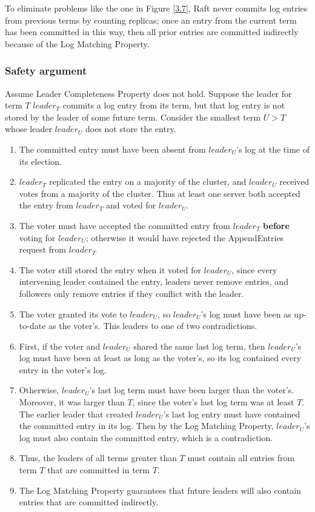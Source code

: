 \documentclass[11pt]{article}
\begin{document}
To eliminate problems like the one in Figure \ref{3.7}, Raft never commits log entries from previous
terms by counting replicas; once an entry from the current term has been committed in this way, then all prior
entries are committed indirectly because of the Log Matching Property.
\subsubsection{Safety argument}
\label{sec:orgeb7a043}
Assume Leader Completeness Property does not hold. Suppose the leader for term \(T\) \(leader_T\)
commits a log entry from its term, but that log entry is not stored by the leader of some future term.
Consider the smallest term \(U>T\) whose leader \(leader_U\) does not store the entry.
\begin{enumerate}
\item The committed entry must have been absent from \(leader_U\)'s log at the time of its election.
\item \(leader_T\) replicated the entry on a majority of the cluster, and \(leader_U\) received votes
from a majority of the cluster. Thus at least one server both accepted the entry from \(leader_T\)
and voted for \(leader_U\).
\item The voter must have accepted the committed entry from \(leader_T\) \textbf{before} voting for \(leader_U\);
otherwise it would have rejected the AppendEntries request from \(leader_T\)
\item The voter still stored the entry when it voted for \(leader_U\), since every intervening leader
contained the entry, leaders never remove entries, and followers only remove entries if they
conflict with the leader.
\item The voter granted its vote to \(leader_U\), so \(leader_U\)'s log must have been as up-to-date as
the voter's. This leaders to one of two contradictions.
\item First, if the voter and \(leader_U\) shared the same last log term, then \(leader_U\)'s log must
have been at least as long as the voter's, so its log contained every entry in the voter's log.
\item Otherwise, \(leader_U\)'s last log term must have been larger than the voter's. Moreover, it was
larger than \(T\), since the voter's last log term was at least \(T\). The earlier leader that
created \(leader_U\)'s last log entry must have contained the committed entry in its log. Then by
the Log Matching Property, \(leader_U\)'s log must also contain the committed entry, which is a contradiction.
\item Thus, the leaders of all terms greater than \(T\) must contain all entries from term \(T\) that are
committed in term \(T\).
\item The Log Matching Property guarantees that future leaders will also contain entries that are
committed indirectly.
\end{enumerate}
\end{document}
